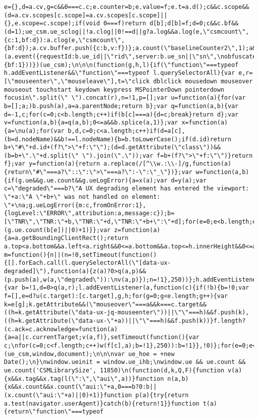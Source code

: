 \documentclass[
]{article}
\begin{document}
\begin{verbatim}
e={},d=a.cv,g=c&&0===c.c;e.counter=b;e.value=f;e.t=a.d();c&&c.scope&&(d=a.cv.scopes[c.scope]=a.cv.scopes[c.scope]||{},e.scope=c.scope);if(void 0===f)return d[b];d[b]=f;d=0;c&&c.bf&&(d=1);ue_csm.ue_sclog||!a.clog||0!==d||g?a.log&&a.log(e,\"csmcount\",{c:1,bf:d}):a.clog(e,\"csmcount\",{bf:d});a.cv.buffer.push({c:b,v:f})};a.count(\"baselineCounter2\",1);a&&a.event&&(a.event({requestId:b.ue_id||\"rid\",server:b.ue_sn||\"sn\",\nobfuscatedMarketplaceId:b.ue_mid||\"mid\"},\"csm\",\"csm.CSMBaselineEvent.4\"),a.count(\"nexusBaselineCounter\",1,{bf:1}))})(ue_csm);\n\n\n(function(g,h,l){if(\"function\"===typeof h.addEventListener&&\"function\"===typeof l.querySelectorAll){var e,r=[\"mouseenter\",\"mouseleave\"],t=\"click dblclick mousedown mouseover mouseout touchstart keydown keypress MSPointerDown pointerdown focusin\".split(\" \").concat(r),n=!1,p=[];var u=function(a){for(var b=[];a;)b.push(a),a=a.parentNode;return b};var q=function(a,b){var d=-1,c;for(c=0;c<b.length;c++)if(b[c]===a){d=c;break}return d};var v=function(a,b){a=q(a,b);0<=a&&b.splice(a,1)};var x=function(a){a=\nu(a);for(var b,d,c=0;c<a.length;c++)if(d=a[c],(b=d.nodeName)&&b!==l.nodeName){b=b.toLowerCase();if(d.id)return b+\"#\"+d.id+(f?\">\"+f:\"\");(d=d.getAttribute(\"class\"))&&(b=b+\".\"+d.split(\" \").join(\".\"));var f=b+(f?\">\"+f:\"\")}return f};var y=function(a){return a.replace(/[^\\w.:\\-]/g,function(a){return\"#\"===a?\"::\":\">\"===a?\":-\":\"_\"})};var w=function(a,b){if(g.ue&&g.ue.count&&g.ueLogError){a=x(a);var d=y(a);var c=\"degraded\"===b?\"A UX degrading element has entered the viewport: \"+a:\"A \"+b+\" was not handled on element: \"+\na;g.ueLogError({m:c,fromOnError:1},{logLevel:\"ERROR\",attribution:a,message:c});b=[\"TNR\",\"TNR:\"+b,\"TNR:\"+d,\"TNR:\"+b+\":\"+d];for(e=0;e<b.length;e++)g.ue.count(b[e],(g.ue.count(b[e])||0)+1)}};var z=function(a){a=a.getBoundingClientRect();return a.top<a.bottom&&a.left<a.right&&0<=a.bottom&&a.top<=h.innerHeight&&0<=a.right&&a.left<=h.innerWidth};var m=function(){n||(n=!0,setTimeout(function(){[].forEach.call(l.querySelectorAll(\"[data-ux-degraded]\"),function(a){z(a)?0>q(a,p)&&(p.push(a),w(a,\"degraded\")):\nv(a,p)});n=!1},250))};h.addEventListener(\"scroll\",m);h.addEventListener(\"resize\",m);m=function(a){var b=!1,d=0>q(a,r);l.addEventListener(a,function(c){if(!b){b=!0;var f=[],e=d?u(c.target):[c.target],g,h;for(g=0;g<e.length;g++){var k=e[g];k.getAttribute&&(\"mouseover\"===a&&k===c.target&&((h=k.getAttribute(\"data-ux-jq-mouseenter\"))||\"\"===h)&&f.push(k),((h=k.getAttribute(\"data-ux-\"+a))||\"\"===h)&&f.push(k))}f.length?(c.ack=c.acknowledge=function(a){a=a||c.currentTarget;v(a,f)},setTimeout(function(){var c;\nfor(c=0;c<f.length;c++)w(f[c],a);b=!1},250)):b=!1}},!0)};for(e=0;e<t.length;e++)m(t[e])}})(ue_csm,window,document);\n\n\nvar ue_hoe = +new Date();\n}\nwindow.ueinit = window.ue_ihb;\nwindow.ue && ue.count && ue.count('CSMLibrarySize', 11850)\n(function(d,k,Q,F){function v(a){x&&x.tag&&x.tag(l(\":\",\"aui\",a))}function n(a,b){x&&x.count&&x.count(\"aui:\"+a,0===b?0:b||(x.count(\"aui:\"+a)||0)+1)}function p(a){try{return a.test(navigator.userAgent)}catch(b){return!1}}function t(a){return\"function\"===typeof 
\end{verbatim}
\end{document}
